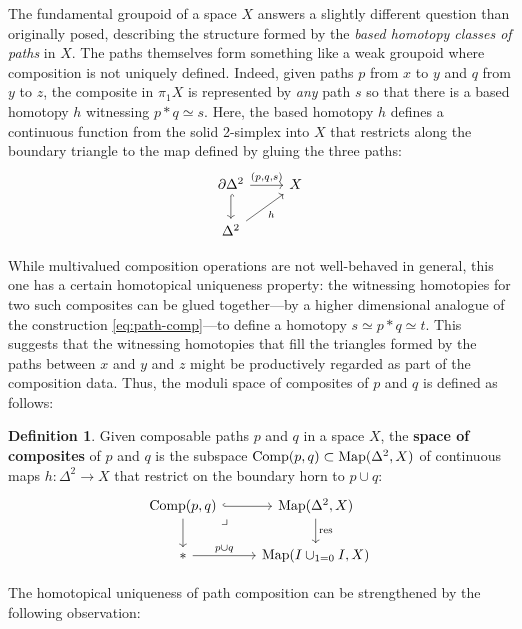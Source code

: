 \documentclass[11pt]{ctexart}
\theoremstyle{definition}
\newtheorem{defn}[thm]{Definition}
\theoremstyle{remark}
\numberwithin{equation}{section}
\newcommand{\Map}{\textup{Map}}
\newcommand{\Comp}{\textup{Comp}}
\newcommand{\res}{\textup{res}}
\newcommand{\1}{\mathbbe{1}}
\newcommand{\2}{\mathbbe{2}}
\newcommand{\3}{\mathbbe{3}}
\begin{document}
The fundamental groupoid of a space $X$ answers a slightly different question than originally posed, describing the structure formed by the \emph{based homotopy classes of paths} in $X$. The paths themselves form something like a weak groupoid where composition is not uniquely defined. Indeed, given paths $p$ from $x$ to $y$ and $q$ from $y$ to $z$, the composite in $\pi_1X$ is represented by \emph{any} path $s$ so that there is a based homotopy $h$ witnessing $p \ast q \simeq s$. Here, the based homotopy $h$ defines a continuous function from the solid 2-simplex into $X$ that restricts along the boundary triangle to the map defined by gluing the three paths:
\[
    \begin{tikzcd}
        \partial\Delta^2 \arrow[r, "{(p,q,s)}"] \arrow[d, hook] & X \\ \Delta^2 \arrow[ur,  "h"']
    \end{tikzcd}
\] 

While multivalued composition operations are not well-behaved in general, this one has a certain homotopical uniqueness property: the witnessing homotopies for two such composites can be glued together---by a higher dimensional analogue of the construction \eqref{eq:path-comp}---to define a homotopy $s \simeq p \ast q \simeq t$.  This suggests that the witnessing homotopies that fill the triangles formed by the paths between $x$ and $y$ and $z$ might be productively regarded as part of the composition data. Thus, the moduli space of composites of $p$ and $q$ is defined as follows:

\begin{defn}\label{defn:space-of-composites} Given composable paths $p$ and $q$ in a  space $X$, the \textbf{space of composites} of $p$ and $q$ is the subspace $\Comp(p,q) \subset \Map(\Delta^2,X)$ of continuous maps $h \colon \Delta^2 \to X$ that restrict on the boundary horn to $p \cup q$:
    \begin{equation}\label{eq:comp-space}\begin{tikzcd} \Comp(p,q) \arrow[r, hook] \arrow[d] \arrow[dr, phantom, "\lrcorner" very near start] & \Map(\Delta^2,X) \arrow[d, "\res"] \\ \ast \arrow[r, "{p \cup q}"] & \Map(I\cup_{1=0} I,X)
    \end{tikzcd}
\end{equation}
\end{defn}

The homotopical uniqueness of path composition can be strengthened by the following observation:
\end{document}
